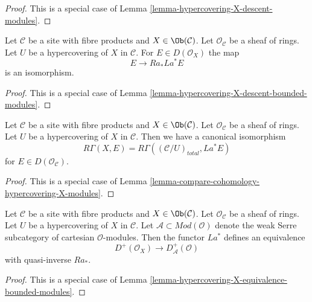 \begin{proof}
This is a special case of
Lemma \ref{lemma-hypercovering-X-descent-modules}.
\end{proof}

\begin{lemma}
\label{lemma-hypercovering-X-simple-descent-bounded-modules}
Let $\mathcal{C}$ be a site with fibre products and $X \in \Ob(\mathcal{C})$.
Let $\mathcal{O}_\mathcal{C}$ be a sheaf of rings.
Let $U$ be a hypercovering of $X$ in $\mathcal{C}$. For
$E \in D(\mathcal{O}_X)$ the map
$$
E \longrightarrow Ra_*La^*E
$$
is an isomorphism.
\end{lemma}

\begin{proof}
This is a special case of
Lemma \ref{lemma-hypercovering-X-descent-bounded-modules}.
\end{proof}

\begin{lemma}
\label{lemma-compare-cohomology-hypercovering-X-simple-modules}
Let $\mathcal{C}$ be a site with fibre products and $X \in \Ob(\mathcal{C})$.
Let $\mathcal{O}_\mathcal{C}$ be a sheaf of rings.
Let $U$ be a hypercovering of $X$ in $\mathcal{C}$.
Then we have a canonical isomorphism
$$
R\Gamma(X, E) = R\Gamma((\mathcal{C}/U)_{total}, La^*E)
$$
for $E \in D(\mathcal{O}_\mathcal{C})$.
\end{lemma}

\begin{proof}
This is a special case of
Lemma \ref{lemma-compare-cohomology-hypercovering-X-modules}.
\end{proof}

\begin{lemma}
\label{lemma-hypercovering-X-simple-equivalence-bounded-modules}
Let $\mathcal{C}$ be a site with fibre products and $X \in \Ob(\mathcal{C})$.
Let $\mathcal{O}_\mathcal{C}$ be a sheaf of rings.
Let $U$ be a hypercovering of $X$ in $\mathcal{C}$.
Let $\mathcal{A} \subset \textit{Mod}(\mathcal{O})$
denote the weak Serre subcategory of cartesian $\mathcal{O}$-modules.
Then the functor $La^*$ defines an equivalence
$$
D^+(\mathcal{O}_X) \longrightarrow D_\mathcal{A}^+(\mathcal{O})
$$
with quasi-inverse $Ra_*$.
\end{lemma}

\begin{proof}
This is a special case of
Lemma \ref{lemma-hypercovering-X-equivalence-bounded-modules}.
\end{proof}







